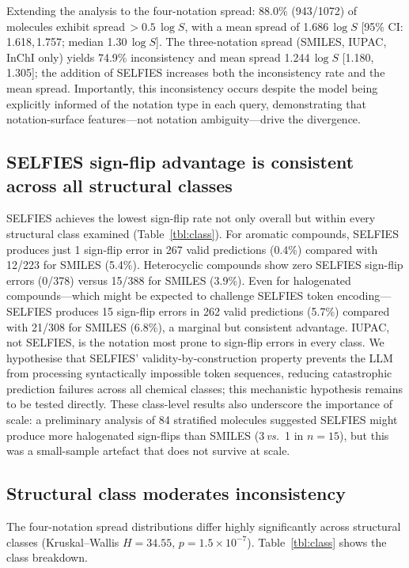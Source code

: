 \documentclass[twoside,twocolumn,9pt]{article}
\newcommand{\logS}{\ensuremath{\log S}}
\begin{document}
Extending the analysis to the four-notation spread: 88.0\% (943/1072) of molecules exhibit spread\,$>0.5$\,$\logS$, with a mean spread of 1.686\,$\logS$ [95\% CI: 1.618,\,1.757; median 1.30\,$\logS$]. The three-notation spread (SMILES, IUPAC, InChI only) yields 74.9\% inconsistency and mean spread 1.244\,$\logS$ [1.180,\,1.305]; the addition of SELFIES increases both the inconsistency rate and the mean spread. Importantly, this inconsistency occurs despite the model being explicitly informed of the notation type in each query, demonstrating that notation-surface features---not notation ambiguity---drive the divergence.

\subsection{SELFIES sign-flip advantage is consistent across all structural classes}
\label{sec:selfies}

SELFIES achieves the lowest sign-flip rate not only overall but within every structural class examined (Table~\ref{tbl:class}). For aromatic compounds, SELFIES produces just 1 sign-flip error in 267 valid predictions (0.4\%) compared with 12/223 for SMILES (5.4\%). Heterocyclic compounds show zero SELFIES sign-flip errors (0/378) versus 15/388 for SMILES (3.9\%). Even for halogenated compounds---which might be expected to challenge SELFIES token encoding---SELFIES produces 15 sign-flip errors in 262 valid predictions (5.7\%) compared with 21/308 for SMILES (6.8\%), a marginal but consistent advantage. IUPAC, not SELFIES, is the notation most prone to sign-flip errors in every class. We hypothesise that SELFIES' validity-by-construction property prevents the LLM from processing syntactically impossible token sequences, reducing catastrophic prediction failures across all chemical classes; this mechanistic hypothesis remains to be tested directly. These class-level results also underscore the importance of scale: a preliminary analysis of 84 stratified molecules suggested SELFIES might produce more halogenated sign-flips than SMILES (3\,\textit{vs.}\ 1 in $n=15$), but this was a small-sample artefact that does not survive at scale.

\subsection{Structural class moderates inconsistency}

The four-notation spread distributions differ highly significantly across structural classes (Kruskal--Wallis $H=34.55$, $p=1.5\!\times\!10^{-7}$). Table~\ref{tbl:class} shows the class breakdown.
\end{document}
